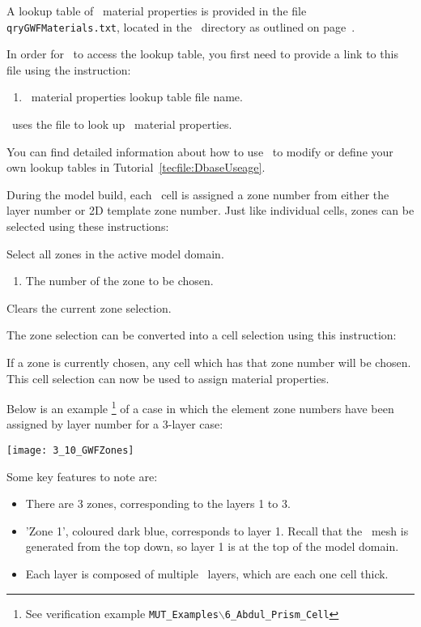 A lookup table of \gwf\ material properties  is provided in the file \texttt{qryGWFMaterials.txt}, located in the \bin\ directory as outlined on page~\pageref{page:userbin}.

In order for \mut\ to access the lookup table, you first need to provide a link to this file using the instruction:

    {
        \squish
        \begin{enumerate}
        \item {}  \gwf\ material properties lookup table file name.
        \end{enumerate}
          \mut\ uses the file  to look up \gwf\ material properties.
    }


You can find detailed information about how to use \dbase\ to modify or define your own lookup tables in Tutorial~\ref{tecfile:DbaseUseage}.

\pagebreak
During the model build, each \gwf\ cell is assigned a zone number from either the layer number or 2D template zone number. Just like individual cells, zones can be selected using these instructions:

    {Select all zones in the active model domain.
     }

    {
        \squish
        \begin{enumerate}
        \item {}  The number of the zone to be chosen.
        \end{enumerate}
        \squish
    }

    {Clears the current zone selection.
     }

The zone selection can be converted into a cell selection using this instruction:

    {If a zone is currently chosen, any cell which has that zone number will be chosen.
     }
This cell selection can now be used to assign material properties.

Below is an example \footnote{See verification example \texttt{MUT\_Examples$\backslash$6\_Abdul\_Prism\_Cell}} of a case in which the element zone numbers have been assigned by layer number for a 3-layer case:

\texttt{[image: 3\_10\_GWFZones]}

\pagebreak
Some key features to note are:
\begin{itemize}
    \item There are 3 zones, corresponding to the layers 1 to 3.
    \item 'Zone 1', coloured dark blue, corresponds to layer 1.  Recall that the \mfus\ mesh is generated from the top down, so layer 1 is at the top of the model domain.
    \item Each layer is composed of multiple \mf\ layers, which are each one cell thick.
\end{itemize}


